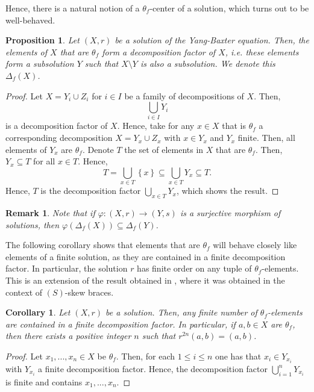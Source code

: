 \documentclass{amsart}
\newtheorem{cor}[thm]{Corollary}
\newtheorem{pro}[thm]{Proposition}
\newtheorem{rem}[thm]{Remark}
\begin{document}
Hence, there is a natural notion of a $\theta_f$-center of a solution, which turns out to be well-behaved.

\begin{pro}\label{thetafofsolution}
    Let $(X,r)$ be a solution of the Yang-Baxter equation. Then, the elements of $X$ that are $\theta_f$ form a decomposition factor of $X$, i.e. these elements form a subsolution $Y$ such that $X\setminus Y$ is also a subsolution. We denote this $\Delta_f(X)$.
\end{pro}
\begin{proof}
    Let $X=Y_i \cup Z_i$ for $i \in I$ be a family of decompositions of $X$. Then, $$ \bigcup_{i \in I} Y_i$$ is a decomposition factor of $X$. Hence, take for any $x \in X$ that is $\theta_f$ a corresponding decomposition $X=Y_x \cup Z_x $ with $x \in Y_x$ and $Y_x$ finite. Then, all elements of $Y_x$ are $\theta_f$. Denote $T$ the set of elements in $X$ that are $\theta_f$. Then, $Y_x \subseteq T$ for all $x \in T$. Hence, $$ T = \bigcup_{x \in T} \left\lbrace x \right\rbrace \subseteq \bigcup_{x \in T} Y_x \subseteq T.$$ Hence, $T$ is the decomposition factor $\displaystyle{\bigcup_{x\in T} Y_x}$, which shows the result. 
\end{proof}

\begin{rem}\label{surjectivedeltaf}
   Note that if $\varphi \colon (X,r) \rightarrow (Y,s)$ is a surjective morphism of solutions, then $\varphi(\Delta_f(X)) \subseteq \Delta_f(Y)$. 
\end{rem}

The following corollary shows that elements that are $\theta_f$ will behave closely like elements of a finite solution, as they are contained in a finite decomposition factor. In particular, the solution $r$ has finite order on any tuple of $\theta_f$-elements. This is an extension of the result obtained in \cite{s}, where it was obtained in the context of $(S)$-skew braces.
\begin{cor}
    Let $(X,r)$ be a solution. Then, any finite number of $\theta_f$-elements are contained in a finite decomposition factor. In particular, if $a,b \in X$ are $\theta_f$, then there exists a positive integer $n$ such that $r^{2n}(a,b)=(a,b)$. 
\end{cor}
\begin{proof}
    Let $x_1,...,x_n \in X$ be $\theta_f$. Then, for each $1\leq i \leq n$ one has that $x_i \in Y_{x_i}$ with $Y_{x_i}$ a finite decomposition factor. Hence, the decomposition factor $\displaystyle{\bigcup_{i=1}^n} Y_{x_i}$ is finite and contains $x_1,...,x_n$.
\end{proof}
\end{document}
